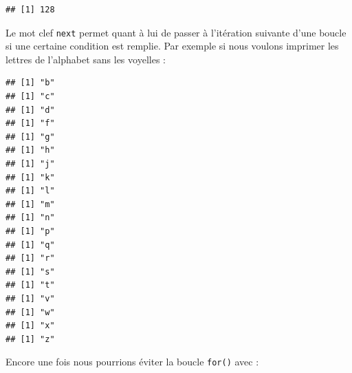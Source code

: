 \documentclass[twoside,symmetric]{book}
\newenvironment{Shaded}{}{}
\newcommand{\ControlFlowTok}[1]{\textbf{#1}}
\newcommand{\DecValTok}[1]{#1}
\newcommand{\KeywordTok}[1]{\textbf{#1}}
\newcommand{\NormalTok}[1]{#1}
\newcommand{\OperatorTok}[1]{#1}
\newcommand{\StringTok}[1]{#1}
\begin{document}
\begin{Shaded}
\end{Shaded}

\begin{verbatim}
## [1] 128
\end{verbatim}

Le mot clef \texttt{next} permet quant à lui de passer à l'itération suivante d'une boucle si une certaine condition est remplie. Par exemple si nous voulons imprimer les lettres de l'alphabet sans les voyelles :

\begin{Shaded}
\end{Shaded}

\begin{verbatim}
## [1] "b"
## [1] "c"
## [1] "d"
## [1] "f"
## [1] "g"
## [1] "h"
## [1] "j"
## [1] "k"
## [1] "l"
## [1] "m"
## [1] "n"
## [1] "p"
## [1] "q"
## [1] "r"
## [1] "s"
## [1] "t"
## [1] "v"
## [1] "w"
## [1] "x"
## [1] "z"
\end{verbatim}

Encore une fois nous pourrions éviter la boucle \texttt{for()} avec :

\begin{Shaded}
\end{Shaded}
\end{document}

